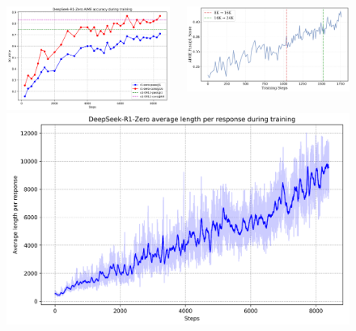 \documentclass[aspectratio=169]{beamer}
\begin{document}
    \begin{frame}
        \begin{figure}
            \begin{columns}
                \begin{column}{0.4\textwidth}
                    \includegraphics[width=\linewidth]{images/deepseek-r1-zero-aime}
                \end{column}
                \begin{column}{0.45\textwidth}
                    \includegraphics[width=\linewidth]{images/deepscaler-aime}
                \end{column}
            \end{columns}
            \begin{columns}
                \begin{column}{0.4\textwidth}
                    \includegraphics[width=\linewidth]{images/deepseek-r1-zero-response-length}

\end{column}
\end{columns}
\end{figure}
\end{frame}
\end{document}
